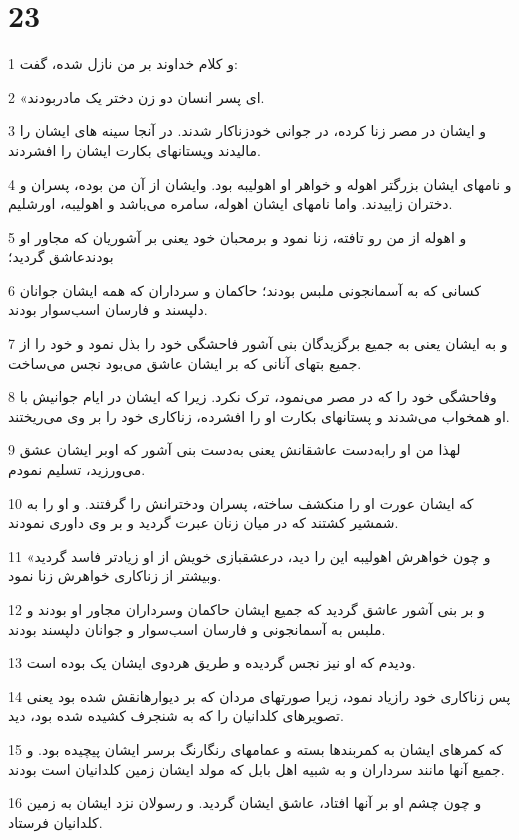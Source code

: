 \chapter{23}

\par 1 و کلام خداوند بر من نازل شده، گفت:
\par 2 «ای پسر انسان دو زن دختر یک مادربودند.
\par 3 و ایشان در مصر زنا کرده، در جوانی خودزناکار شدند. در آنجا سینه های ایشان را مالیدند وپستانهای بکارت ایشان را افشردند.
\par 4 و نامهای ایشان بزرگتر اهوله و خواهر او اهولیبه بود. وایشان از آن من بوده، پسران و دختران زاییدند. واما نامهای ایشان اهوله، سامره می‌باشد و اهولیبه، اورشلیم.
\par 5 و اهوله از من رو تافته، زنا نمود و برمحبان خود یعنی بر آشوریان که مجاور او بودندعاشق گردید؛
\par 6 کسانی که به آسمانجونی ملبس بودند؛ حاکمان و سرداران که همه ایشان جوانان دلپسند و فارسان اسب‌سوار بودند.
\par 7 و به ایشان یعنی به جمیع برگزیدگان بنی آشور فاحشگی خود را بذل نمود و خود را از جمیع بتهای آنانی که بر ایشان عاشق می‌بود نجس می‌ساخت.
\par 8 وفاحشگی خود را که در مصر می‌نمود، ترک نکرد. زیرا که ایشان در ایام جوانیش با او همخواب می‌شدند و پستانهای بکارت او را افشرده، زناکاری خود را بر وی می‌ریختند.
\par 9 لهذا من او رابه‌دست عاشقانش یعنی به‌دست بنی آشور که اوبر ایشان عشق می‌ورزید، تسلیم نمودم.
\par 10 که ایشان عورت او را منکشف ساخته، پسران ودخترانش را گرفتند. و او را به شمشیر کشتند که در میان زنان عبرت گردید و بر وی داوری نمودند.
\par 11 «و چون خواهرش اهولیبه این را دید، درعشقبازی خویش از او زیادتر فاسد گردید وبیشتر از زناکاری خواهرش زنا نمود.
\par 12 و بر بنی آشور عاشق گردید که جمیع ایشان حاکمان وسرداران مجاور او بودند و ملبس به آسمانجونی و فارسان اسب‌سوار و جوانان دلپسند بودند.
\par 13 ودیدم که او نیز نجس گردیده و طریق هردوی ایشان یک بوده است.
\par 14 پس زناکاری خود رازیاد نمود، زیرا صورتهای مردان که بر دیوارهانقش شده بود یعنی تصویرهای کلدانیان را که به شنجرف کشیده شده بود، دید.
\par 15 که کمرهای ایشان به کمربندها بسته و عمامهای رنگارنگ برسر ایشان پیچیده بود. و جمیع آنها مانند سرداران و به شبیه اهل بابل که مولد ایشان زمین کلدانیان است بودند.
\par 16 و چون چشم او بر آنها افتاد، عاشق ایشان گردید. و رسولان نزد ایشان به زمین کلدانیان فرستاد.
